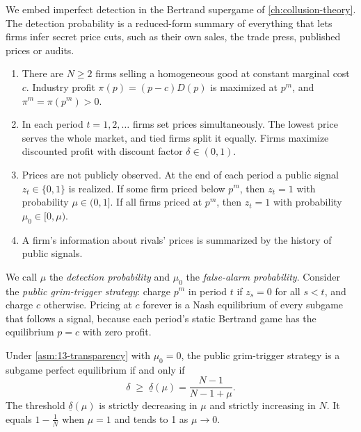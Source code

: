 We embed imperfect detection in the Bertrand supergame of \cref{ch:collusion-theory}. The detection probability
is a reduced-form summary of everything that lets firms infer secret price cuts, such as their own sales, the
trade press, published prices or audits.

\begin{assumption}\label{asm:13-transparency}
\leavevmode
\begin{enumerate}[label=(\roman*)]
\item There are $N \ge 2$ firms selling a homogeneous good at constant marginal cost $c$. Industry profit
$\pi(p) = (p - c)D(p)$ is maximized at $p^m$, and $\pi^m = \pi(p^m) > 0$.
\item In each period $t = 1, 2, \dots$ firms set prices simultaneously. The lowest price serves the whole market,
and tied firms split it equally. Firms maximize discounted profit with discount factor $\delta \in (0,1)$.
\item Prices are not publicly observed. At the end of each period a public signal $z_t \in \{0, 1\}$ is realized.
If some firm priced below $p^m$, then $z_t = 1$ with probability $\mu \in (0,1]$. If all firms priced at
$p^m$, then $z_t = 1$ with probability $\mu_0 \in [0, \mu)$.
\item A firm's information about rivals' prices is summarized by the history of public signals.
\end{enumerate}
\end{assumption}

We call $\mu$ the \emph{detection probability} and $\mu_0$ the \emph{false-alarm probability}. Consider the
\emph{public grim-trigger strategy}: charge $p^m$ in period $t$ if $z_s = 0$ for all $s < t$, and charge $c$
otherwise. Pricing at $c$ forever is a Nash equilibrium of every subgame that follows a signal, because each
period's static Bertrand game has the equilibrium $p = c$ with zero profit.

\begin{proposition}\label{prop:13-transparency}
Under \cref{asm:13-transparency} with $\mu_0 = 0$, the public grim-trigger strategy is a subgame perfect
equilibrium if and only if
\begin{equation}\label{eq:13-transparency}
  \delta \;\ge\; \underline\delta(\mu) = \frac{N - 1}{N - 1 + \mu} .
\end{equation}
The threshold $\underline\delta(\mu)$ is strictly decreasing in $\mu$ and strictly increasing in $N$. It equals
$1 - \frac{1}{N}$ when $\mu = 1$ and tends to 1 as $\mu \to 0$.
\end{proposition}

